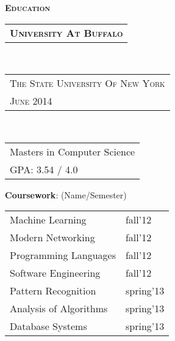 \documentclass[10pt,a4paper,oneside]{article}
\begin{document}
    \hspace{2ex}
    \begin{minipage}[t]{0.33\textwidth}
        \vspace{0pt}
        \textcolor{light-gray}{\textbf{\large E\textsc{ducation}}}
        \vspace{10pt}\\
        \begin{tabular}{c}
            \textbf{\normalsize U\textsc{niversity} A\textsc{t} B\textsc{uffalo}}
        \end{tabular}\\
        \textcolor{light-gray}{
            \begin{tabular}{l}
                {\small T\textsc{he} S\textsc{tate} U\textsc{niversity} O\textsc{f} N\textsc{ew} Y\textsc{ork}}\\
                {\small J\textsc{une} 2014}
            \end{tabular}
        }\\ 
        \begin{tabular}{l}
            {\small Masters in Computer Science }\\
            {\small GPA: 3.54 / 4.0}
        \end{tabular}
        \vspace{0pt}
        \begin{adjustwidth}{7pt}{0pt}
            {\small \textbf{Coursework}: (Name/Semester)}\\
        \end{adjustwidth}
        \vspace{-11pt}
        \begin{adjustwidth}{7pt}{0pt}
            \begin{tabular}{ll}
                { \footnotesize Machine Learning } & {\footnotesize fall'12}\\                
                { \footnotesize Modern Networking } & {\footnotesize fall'12}\\
                { \footnotesize Programming Languages } & {\footnotesize fall'12}\\
                { \footnotesize Software Engineering } & {\footnotesize fall'12}\\
                { \footnotesize Pattern Recognition } & {\footnotesize spring'13}\\
                { \footnotesize Analysis of Algorithms } & {\footnotesize spring'13}\\
                { \footnotesize Database Systems } & {\footnotesize spring'13}\\

\end{tabular}
\end{adjustwidth}
\end{minipage}
\end{document}
